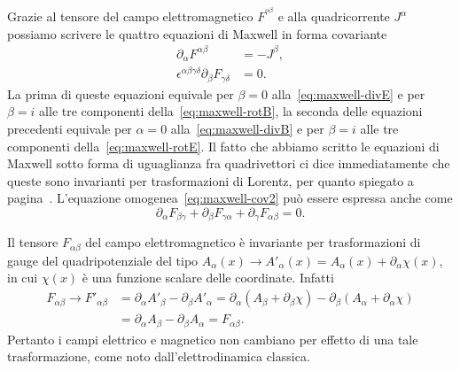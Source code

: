Grazie al tensore del campo elettromagnetico $F^{^{\alpha\beta}}$ e alla
quadricorrente $J^{\alpha}$ possiamo scrivere le quattro
equazioni di Maxwell in forma covariante
\begin{subequations}
  \begin{align}
    \partial_{\alpha}F^{\alpha\beta} &= -J^{\beta}, \label{eq:maxwell-cov1} \\
    \epsilon^{\alpha\beta\gamma\delta} \partial_{\beta} F_{\gamma\delta} &=
    0. \label{eq:maxwell-cov2}
  \end{align}
\end{subequations}
La prima di queste equazioni equivale per $\beta=0$ alla~\eqref{eq:maxwell-divE}
e per $\beta = i$ alle tre componenti della~\eqref{eq:maxwell-rotB}, la seconda
delle equazioni precedenti equivale per $\alpha = 0$
alla~\eqref{eq:maxwell-divB} e per $\beta = i$ alle tre componenti
della~\eqref{eq:maxwell-rotE}.  Il fatto che abbiamo scritto le
equazioni di Maxwell sotto forma di uguaglianza fra
quadrivettori ci dice immediatamente che queste sono invarianti per
trasformazioni di Lorentz, per quanto spiegato a
pagina~\pageref{invarianza-lorentz}.  L'equazione
omogenea~\eqref{eq:maxwell-cov2} può essere espressa anche come
\begin{equation}
  \label{eq:maxwell-cov22}
  \partial_{\alpha}F_{\beta\gamma} + \partial_{\beta}F_{\gamma\alpha}
  + \partial_{\gamma}F_{\alpha\beta} = 0.
\end{equation}

Il tensore $F_{\alpha\beta}$ del campo elettromagnetico è invariante per
trasformazioni di gauge del quadripotenziale del tipo
$A_{\alpha}(x) \to A'_{\alpha}(x) = A_{\alpha}(x) + \partial_{\alpha}\chi(x)$,
in cui $\chi(x)$ è una funzione scalare delle coordinate.  Infatti
\begin{equation}
  \begin{split}
    F_{\alpha\beta} \to F'_{\alpha\beta} &= \partial_{\alpha}A'_{\beta}
    - \partial_{\beta}A'_{\alpha} = \partial_{\alpha}(A_{\beta}
    + \partial_{\beta}\chi) - \partial_{\beta}(A_{\alpha}
    + \partial_{\alpha}\chi) \\
    &= \partial_{\alpha}A_{\beta} - \partial_{\beta}A_{\alpha} =
    F_{\alpha\beta}.
  \end{split}
\end{equation}
Pertanto i campi elettrico e magnetico non cambiano per effetto di una tale
trasformazione, come noto dall'elettrodinamica classica.

